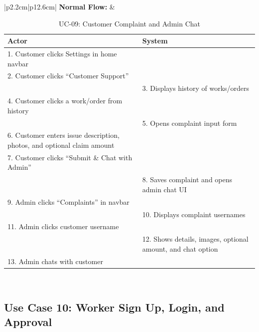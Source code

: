 {\footnotesize
\setlength{\tabcolsep}{3pt}
\renewcommand{\arraystretch}{0.9}
\begin{table}[H]
\centering
\begin{tabular}{|p{2.2cm}|p{12.6cm}|}
\hline
\textbf{Normal Flow:} &
\begin{tabular}[t]{|p{6.15cm}|p{6.15cm}|}
\hline
\textbf{Actor} & \textbf{System} \\ \hline
1. Customer clicks Settings in home navbar & \\ \hline
2. Customer clicks ``Customer Support'' & \\ \hline
 & 3. Displays history of works/orders \\ \hline
4. Customer clicks a work/order from history & \\ \hline
 & 5. Opens complaint input form \\ \hline
6. Customer enters issue description, photos, and optional claim amount & \\ \hline
7. Customer clicks ``Submit \& Chat with Admin'' & \\ \hline
 & 8. Saves complaint and opens admin chat UI \\ \hline
9. Admin clicks ``Complaints'' in navbar & \\ \hline
 & 10. Displays complaint usernames \\ \hline
11. Admin clicks customer username & \\ \hline
 & 12. Shows details, images, optional amount, and chat option \\ \hline
13. Admin chats with customer & \\ \hline
\end{tabular} \\ \hline
\end{tabular}
\caption{UC-09: Customer Complaint and Admin Chat}
\end{table}
}

\newpage

\subsection*{Use Case 10: Worker Sign Up, Login, and Approval}

